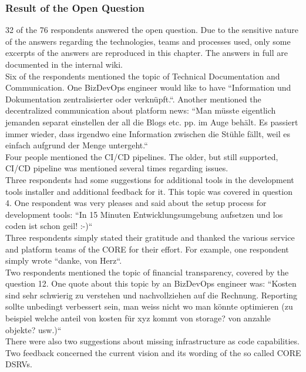 \documentclass[a4paper,12pt]{article}
\begin{document}
    \subsubsection{Result of the Open Question}
    \label{sssec:ropque}
    32 of the 76 respondents answered the open question.
    Due to the sensitive nature of the answers regarding the technologies, teams and processes used, only some excerpts
    of the answers are reproduced in this chapter.
    The answers in full are documented in the internal wiki\parencite{sbbdevopsexperience}.\\
    Six of the respondents mentioned the topic of Technical Documentation and Communication.
    One BizDevOps engineer would like to have ``Information und Dokumentation zentralisierter oder verknüpft.``.
    Another mentioned the decentralized communication about platform news: ``Man müsste eigentlich jemanden separat einstellen
    der all die Blogs etc. pp. im Auge behält. Es passiert immer wieder, dass irgendwo eine Information zwischen die
    Stühle fällt, weil es einfach aufgrund der Menge untergeht.``\\
    Four people mentioned the CI/CD pipelines.
    The older, but still supported, CI/CD pipeline was mentioned several times regarding issues. \\
    Three respondents had some suggestions for additional tools in the development tools installer and additional
    feedback for it.
    This topic was covered in question 4.
    One respondent was very pleases and said about the setup process for development tools: ``In 15 Minuten
    Entwicklungsumgebung aufsetzen und los coden ist schon geil! :-)``\\
    Three respondents simply stated their gratitude and thanked the various service and platform teams of the CORE for
    their effort.
    For example, one respondent simply wrote ``danke, von Herz``.\\
    Two respondents mentioned the topic of financial transparency, covered by the question 12.
    One quote about this topic by an BizDevOps engineer was: ``Kosten sind sehr schwierig zu verstehen und nachvollziehen auf die Rechnung. Reporting
    sollte unbedingt verbessert sein, man weiss nicht wo man könnte optimieren (zu beispiel welche anteil von kosten für
    xyz kommt von storage? von anzahle objekte? usw.)``\\
    There were also two suggestions about missing infrastructure as code capabilities.\\
    Two feedback concerned the current vision and its wording of the so called CORE DSRVs.\\
\end{document}
